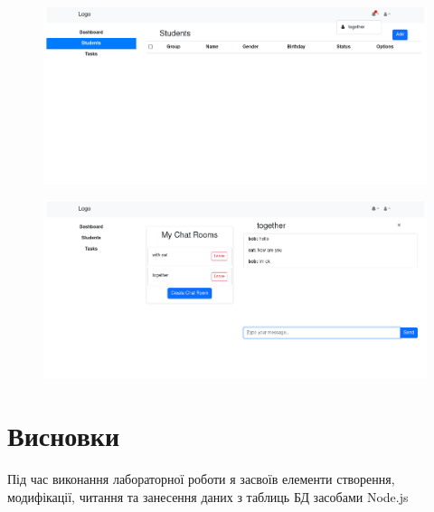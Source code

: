 \documentclass{article}
\begin{document}
\begin{normalsize}
\begin{figure}[H]
	\centering
	\includegraphics[width=\textwidth]{4}
\end{figure}

\begin{figure}[H]
	\centering
	\includegraphics[width=\textwidth]{5}
\end{figure}

\section*{Висновки}
Під час виконання лабораторної роботи я засвоїв елементи створення, модифікації, читання та занесення даних з
таблиць БД засобами Node.js
	    
\end{normalsize}
\end{document}
